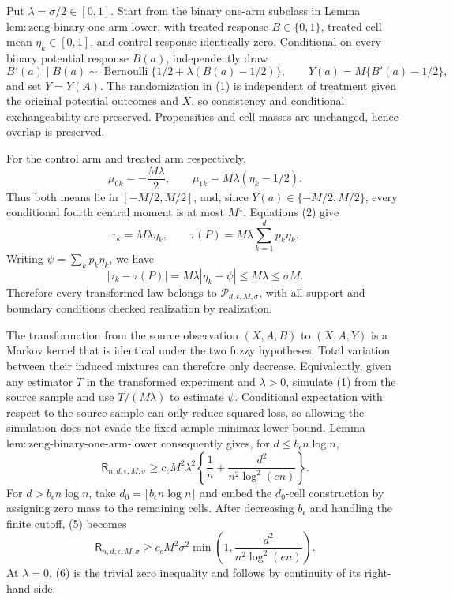 Put \(\lambda=\sigma/2\in[0,1]\).  Start from the binary one-arm subclass in Lemma~\(\mathrm{lem:zeng\text{-}binary\text{-}one\text{-}arm\text{-}lower}\), with treated response \(B\in\{0,1\}\), treated cell mean \(\eta_k\in[0,1]\), and control response identically zero.  Conditional on every binary potential response \(B(a)\), independently draw
\[
 B'(a)\mid B(a)\sim\operatorname{Bernoulli}\{1/2+\lambda(B(a)-1/2)\},
 \qquad Y(a)=M\{B'(a)-1/2\},
\tag{1}
\]
and set \(Y=Y(A)\).  The randomization in (1) is independent of treatment given the original potential outcomes and \(X\), so consistency and conditional exchangeability are preserved.  Propensities and cell masses are unchanged, hence overlap is preserved.

For the control arm and treated arm respectively,
\[
 \mu_{0k}=-\frac{M\lambda}{2},\qquad
 \mu_{1k}=M\lambda(\eta_k-1/2).
\tag{2}
\]
Thus both means lie in \([-M/2,M/2]\), and, since \(Y(a)\in\{-M/2,M/2\}\), every conditional fourth central moment is at most \(M^4\).  Equations (2) give
\[
 \tau_k=M\lambda\eta_k,\qquad
 \tau(P)=M\lambda\sum_{k=1}^dp_k\eta_k.
\tag{3}
\]
Writing \(\psi=\sum_kp_k\eta_k\), we have
\[
 |\tau_k-\tau(P)|=M\lambda|\eta_k-\psi|\le M\lambda\le\sigma M.
\tag{4}
\]
Therefore every transformed law belongs to \(\mathcal P_{d,\epsilon,M,\sigma}\), with all support and boundary conditions checked realization by realization.

The transformation from the source observation \((X,A,B)\) to \((X,A,Y)\) is a Markov kernel that is identical under the two fuzzy hypotheses.  Total variation between their induced mixtures can therefore only decrease.  Equivalently, given any estimator \(T\) in the transformed experiment and \(\lambda>0\), simulate (1) from the source sample and use \(T/(M\lambda)\) to estimate \(\psi\).  Conditional expectation with respect to the source sample can only reduce squared loss, so allowing the simulation does not evade the fixed-sample minimax lower bound.  Lemma~\(\mathrm{lem:zeng\text{-}binary\text{-}one\text{-}arm\text{-}lower}\) consequently gives, for \(d\le b_{\epsilon}n\log n\),
\[
 \mathsf R_{n,d,\epsilon,M,\sigma}
 \ge c_{\epsilon}M^2\lambda^2\left\{\frac1n+\frac{d^2}{n^2\log^2(en)}\right\}.
\tag{5}
\]
For \(d>b_{\epsilon}n\log n\), take \(d_0=\lfloor b_{\epsilon}n\log n\rfloor\) and embed the \(d_0\)-cell construction by assigning zero mass to the remaining cells.  After decreasing \(b_{\epsilon}\) and handling the finite cutoff, (5) becomes
\[
 \mathsf R_{n,d,\epsilon,M,\sigma}
 \ge c_{\epsilon}M^2\sigma^2
 \min\left(1,\frac{d^2}{n^2\log^2(en)}\right).
\tag{6}
\]
At \(\lambda=0\), (6) is the trivial zero inequality and follows by continuity of its right-hand side.

